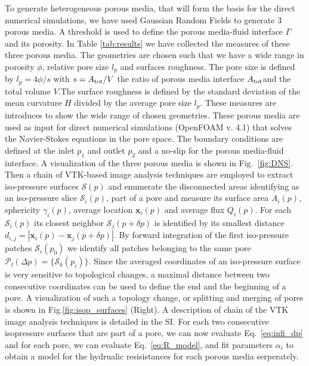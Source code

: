 \documentclass[draft]{agujournal2019}
\begin{document}
To generate heterogeneous porous media, that will form the basis for the direct numerical simulations, we have used Gaussian Random Fields to generate 3 porous media. A threshold is used to define the porous media-fluid interface $\Gamma$ and its porosity. In Table \ref{tab:results} we have collected the measures of these three porous media. The geometries are chosen such that we have a wide range in porosity $\phi$, relative pore size $l_p$ and surfaces roughness. The pore size is defined by $l_p = 4 \phi/s$ with $s= A_{\rm{tot}}/V$ the ratio of porous media interface $A_{\rm{tot}}$and the total volume $V$.The surface roughness is defined by the standard deviation of the mean curvature $H$ divided by the average pore size $l_p$. These measures are introduces to show the wide range of chosen geometries. These porous media are used as input for direct numerical simulations (OpenFOAM v. 4.1) \cite{weller_tensorial_1998} that solves the Navier-Stokes equations in the pore space. The boundary conditions are defined at the inlet $p_1$ and outlet $p_2$ and a no-slip for the porous media-fluid interface. A visualization of the three porous media is shown in Fig.~\ref{fig:DNS}. Then a chain of VTK-based image analysis techniques  are employed to extract iso-pressure surfaces $\mathcal{S}(p)$ and enumerate the disconnected areas identifying as an iso-pressure slice $\mathcal{S}_i(p)$, part of a pore and measure its surface area $A_i(p)$, sphericity $\gamma_i(p)$, average location $\mathbf{x}_i(p)$ and average flux $Q_i(p)$. For each $\mathcal{S}_i(p)$ its closest neighbor $\mathcal{S}_j(p+\delta p)$ is identified by its smallest distance $d_{i,j}= \left|  \mathbf{x}_i(p)-\mathbf{x}_j(p+\delta p)\right|$. By forward integration of the first iso-pressure patches $\mathcal{S}_i(p_0)$ we identify all patches belonging to the same pore $\mathcal{P}_l(\Delta p) = \{\mathcal{S}_k(p_i)\}$. Since the averaged coordinates of an iso-pressure surface is very sensitive to topological changes, a maximal distance between two consecutive coordinates can be used to define the end and the beginning of a pore. A visualization of such a topology change, or splitting and merging of pores is shown in Fig.\ref{fig:isop_surfaces} (Right). A description of chain of the VTK image analysis techniques is detailed in the SI. For each two consecutive isopressure surfaces that are part of a pore, we can now evaluate Eq.~\ref{eq:infi_dp} and for each pore, we can evaluate Eq.~\ref{eq:R_model}, and fit parameters $\alpha_i$ to obtain a model for the hydrualic resisistances for each porous media serperately. 
\end{document}
